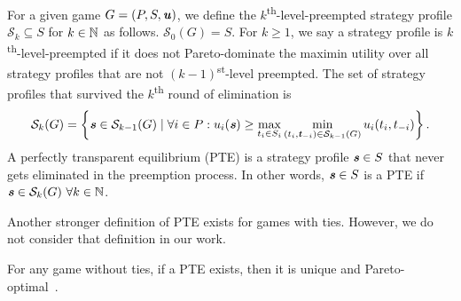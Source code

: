\begin{definition}
  For a given game $G = (P, S, \boldsymbol{\mathit{u}})$, we define the $k$\textsuperscript{th}-level-preempted strategy profile $\mathcal{S}_k \subseteq S$ for $k \in \mathbb{N}$ as follows.
  $\mathcal{S}_0(G) = S$.
  For $k \ge 1$, we say a strategy profile is $k$\textsuperscript{th}-level-preempted if it does not Pareto-dominate the maximin utility over all strategy profiles that are not $(k-1)$\textsuperscript{st}-level preempted.
  The set of strategy profiles that survived the $k$\textsuperscript{th} round of elimination is
  \[
    \mathcal{S}_k(G) = \left\{\boldsymbol{\mathit{s}} \in \mathcal{S}_{k-1}(G) \mid \forall i \in P: u_i(\boldsymbol{\mathit{s}}) \ge \max_{t_i \in S_i}\min_{(t_i, \boldsymbol{\mathit{t}}_{-i}) \in \mathcal{S}_{k-1}(G)} u_i(t_i, t_{-i})\right\}.
  \]
  A perfectly transparent equilibrium (PTE) is a strategy profile $\boldsymbol{\mathit{s}} \in S$ that never gets eliminated in the preemption process.
  In other words, $\boldsymbol{\mathit{s}} \in S$ is a PTE if $\boldsymbol{\mathit{s}} \in \mathcal{S}_k(G)\ \forall k \in \mathbb{N}$.
\end{definition}

\begin{remark}
  Another stronger definition of PTE exists for games with ties.
  However, we do not consider that definition in our work.
\end{remark}

For any game without ties, if a PTE exists, then it is unique and Pareto-optimal~\cite{Fourny20}.
